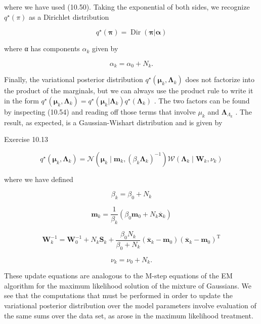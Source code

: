 \documentclass[
  10
]{article}
\begin{document}
where we have used (10.50). Taking the exponential of both sides, we
recognize \(q ^ { \star } ( \pi )\) as a Dirichlet distribution

\[
q ^ {\star} (\boldsymbol {\pi}) = \operatorname{Dir} (\boldsymbol {\pi} | \boldsymbol {\alpha})\tag{10.57}
\]

where α has components \(\alpha _ { k }\) given by

\[
\alpha_ {k} = \alpha_ {0} + N _ {k}.\tag{10.58}
\]

Finally, the variational posterior distribution
\(q ^ { \star } ( \pmb { \mu } _ { k } , \pmb { \Lambda } _ { k } )\)
does not factorize into the product of the marginals, but we can always
use the product rule to write it in the form
\(q ^ { \star } ( { \pmb \mu } _ { k } , \pmb \Lambda _ { k } ) = q ^ { \star } ( { \pmb \mu } _ { k } | \pmb \Lambda _ { k } ) q ^ { \star } ( \pmb \Lambda _ { k } )\)
. The two factors can be found by inspecting (10.54) and reading off
those terms that involve \(\mu _ { k }\) and
\(\mathbf { \Lambda } _ { \Lambda _ { k } }\) . The result, as expected,
is a Gaussian-Wishart distribution and is given by

Exercise 10.13

\[
q ^ {\star} \left(\boldsymbol {\mu} _ {k}, \boldsymbol {\Lambda} _ {k}\right) = \mathcal {N} \left(\boldsymbol {\mu} _ {k} \mid \mathbf {m} _ {k}, \left(\beta_ {k} \boldsymbol {\Lambda} _ {k}\right) ^ {- 1}\right) \mathcal {W} \left(\boldsymbol {\Lambda} _ {k} \mid \mathbf {W} _ {k}, \nu_ {k}\right)\tag{10.59}
\]

where we have defined

\[
\beta_ {k} = \beta_ {0} + N _ {k}\tag{10.60}
\]

\[
{\mathbf {m} _ {k}} = {\frac {1}{\beta_ {k}} \left(\beta_ {0} \mathbf {m} _ {0} + N _ {k} \overline {{\mathbf {x}}} _ {k}\right)}\tag{10.61}
\]

\[
{\mathbf {W} _ {k} ^ {- 1}} = {\mathbf {W} _ {0} ^ {- 1} + N _ {k} \mathbf {S} _ {k} + \frac {\beta_ {0} N _ {k}}{\beta_ {0} + N _ {k}} (\overline {{\mathbf {x}}} _ {k} - \mathbf {m} _ {0}) (\overline {{\mathbf {x}}} _ {k} - \mathbf {m} _ {0}) ^ {\mathrm{T}}}\tag{10.62}
\]

\[
\nu_ {k} = \nu_ {0} + N _ {k}.\tag{10.63}
\]

These update equations are analogous to the M-step equations of the EM
algorithm for the maximum likelihood solution of the mixture of
Gaussians. We see that the computations that must be performed in order
to update the variational posterior distribution over the model
parameters involve evaluation of the same sums over the data set, as
arose in the maximum likelihood treatment.
\end{document}
